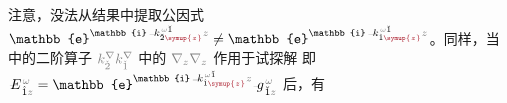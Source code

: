 注意，没法从结果中提取公因式 $\mathbb{e}^{\mathbb{i} \xint{\begin{smallmatrix} ~ \\ {}^{}_{\mathcolor{gray}{-}} \\ ~ \end{smallmatrix}}{15}{k}_{\breve{2} \textcolor{Maroon}{\symup{z}}}^{\;\! \mathcolor{gray}{\omega} \breve{1}} \mathcolor{gray}{z}} \neq \mathbb{e}^{\mathbb{i} \xint{\begin{smallmatrix} ~ \\ {}^{}_{\mathcolor{gray}{-}} \\ ~ \end{smallmatrix}}{15}{k}_{\hat{1} \textcolor{Maroon}{\symup{z}}}^{\;\! \mathcolor{gray}{\omega} \breve{1}} \mathcolor{gray}{z}}$。同样，当  中的二阶算子 $\mathcolor{gray}{k^\nabla_{\check{2}}} \mathcolor{gray}{k^\nabla_{\check{1}}}$ 中的 $\mathcolor{gray}{\nabla_z} \mathcolor{gray}{\nabla_z}$ 作用于试探解  即 $
\xint{\mathcolor{gray}{-}}{25}{E}^{\;\!\mathcolor{gray}{\omega}}_{\;\! \hat{1} \mathcolor{gray}{z}} = \mathbb{e}^{\mathbb{i} \xint{\begin{smallmatrix} ~ \\ {}^{}_{\mathcolor{gray}{-}} \\ ~ \end{smallmatrix}}{15}{k}_{\hat{1} \textcolor{Maroon}{\symup{z}}}^{\;\! \mathcolor{gray}{\omega} \breve{1}} \mathcolor{gray}{z}} \xint{{}^{}_{\mathcolor{gray}{-}}}{10}{g}^{\;\!\mathcolor{gray}{\omega}}_{\;\! \breve{1} \mathcolor{gray}{z}}$ 后，有
